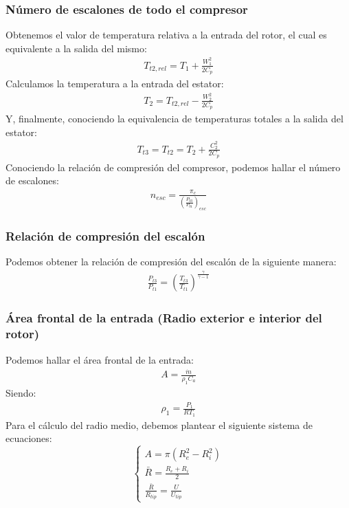 \documentclass{report}
\begin{document}
\subsubsection{Número de escalones de todo el compresor}
Obtenemos el valor de temperatura relativa a la entrada del rotor, el cual es equivalente a la salida del mismo:
\begin{gather}
T_{t2,rel} = T_1 + \frac{W_1^2}{2 C_p}
\end{gather}
Calculamos la temperatura a la entrada del estator:
\begin{gather}
T_2 = T_{t2,rel} - \frac{W_2^2}{2 C_p}
\end{gather}
Y, finalmente, conociendo la equivalencia de temperaturas totales a la salida del estator:
\begin{gather}
T_{t3} = T_{t2} = T_2 + \frac{C_2^2}{2 C_p}
\end{gather}
Conociendo la relación de compresión del compresor, podemos hallar el número de escalones:
\begin{gather}
n_{esc} = \frac{\pi_c}{\left(\frac{P_{03}}{P_{01}}\right)_{esc}}
\end{gather}
\subsubsection{Relación de compresión del escalón}
Podemos obtener la relación de compresión del escalón de la siguiente manera:
\begin{gather}
\frac{P_{t3}}{P_{t1}} = \left(\frac{T_{t3}}{T_{t1}}\right)^\frac{\gamma}{\gamma-1}
\end{gather}
\subsubsection{Área frontal de la entrada (Radio exterior e interior del rotor)}
Podemos hallar el área frontal de la entrada:
\begin{gather}
A = \frac{\Dot{m}}{\rho_1 C_a}
\end{gather}
Siendo:
\begin{gather}
\rho_1 = \frac{P_1}{R T_1}
\end{gather}
Para el cálculo del radio medio, debemos plantear el siguiente sistema de ecuaciones:
\[
\left\{
\begin{aligned}
A = \pi (R_e^2 - R_i^2)\\
\bar{R} = \frac{R_e + R_i}{2}\\
\frac{\bar{R}}{R_{tip}} = \frac{U}{U_{tip}}
\end{aligned}
\right.
\]
\end{document}
